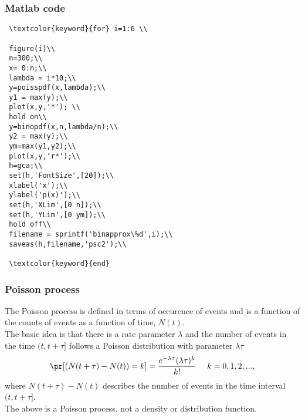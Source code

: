 \begin{frame}[fragile]\frametitle{Matlab code}

{\tiny

\begin{lstlisting}
 \textcolor{keyword}{for} i=1:6 \\
 
 figure(i)\\
 n=300;\\
 x= 0:n;\\
 lambda = i*10;\\
 y=poisspdf(x,lambda);\\
 y1 = max(y);\\
 plot(x,y,'*'); \\
 hold on\\
 y=binopdf(x,n,lambda/n);\\
 y2 = max(y);\\
 ym=max(y1,y2);\\
 plot(x,y,'r*');\\
 h=gca;\\
 set(h,'FontSize',[20]);\\
 xlabel('x');\\
 ylabel('p(x)');\\
 set(h,'XLim',[0 n]);\\
 set(h,'YLim',[0 ym]);\\
 hold off\\
 filename = sprintf('binapprox\%d',i);\\
 saveas(h,filename,'psc2');\\

 \textcolor{keyword}{end}
\end{lstlisting}
}
\end{frame}


\begin{frame}[fragile]\frametitle{Poisson process}

The Poisson process is defined in terms of occurence of events and
is a function of the counts of events as a function of time,
$N(t)$. \\ 

The basic idea is that there is a rate parameter $\lambda$ and 
the number of events in the time $(t,t+\tau]$ follows a Poisson
distribution with parameter $\lambda \tau$ 
$$\pr[(N(t+\tau)-N(t)) = k] = \frac{e^{-\lambda \tau} (\lambda
  \tau)^k}{k!} \, \, \, \, \, \, \, \, k=0,1,2,...,$$
where $N(t+\tau)-N(t)$ describes the number of events in 
the time interval $(t,t+\tau]$. \\ 

The above is a Poisson process, not a density or distribution 
function.

\end{frame}



